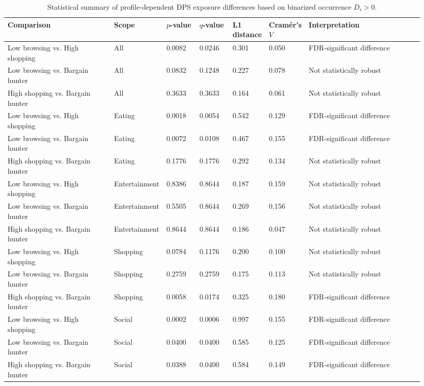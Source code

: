 \begin{table}[htbp]
    \centering
    \caption{Statistical summary of profile-dependent DPS exposure differences based on binarized occurrence \(D_i>0\).}
    \label{tab:statistical-summary}
    \footnotesize
    \setlength{\tabcolsep}{4pt}
    \renewcommand{\arraystretch}{1.08}
    \begin{tabular}{@{}p{0.26\linewidth}p{0.09\linewidth}p{0.08\linewidth}p{0.08\linewidth}p{0.08\linewidth}p{0.08\linewidth}p{0.28\linewidth}@{}}
        \toprule
        Comparison & Scope & $p$-value & $q$-value & L1 distance & Cramér's $V$ & Interpretation \\
        \midrule
        Low browsing vs. High shopping & All & 0.0082 & 0.0246 & 0.301 & 0.050 & FDR-significant difference \\
        Low browsing vs. Bargain hunter & All & 0.0832 & 0.1248 & 0.227 & 0.078 & Not statistically robust \\
        High shopping vs. Bargain hunter & All & 0.3633 & 0.3633 & 0.164 & 0.061 & Not statistically robust \\
        Low browsing vs. High shopping & Eating & 0.0018 & 0.0054 & 0.542 & 0.129 & FDR-significant difference \\
        Low browsing vs. Bargain hunter & Eating & 0.0072 & 0.0108 & 0.467 & 0.155 & FDR-significant difference \\
        High shopping vs. Bargain hunter & Eating & 0.1776 & 0.1776 & 0.292 & 0.134 & Not statistically robust \\
        Low browsing vs. High shopping & Entertainment & 0.8386 & 0.8644 & 0.187 & 0.159 & Not statistically robust \\
        Low browsing vs. Bargain hunter & Entertainment & 0.5505 & 0.8644 & 0.269 & 0.156 & Not statistically robust \\
        High shopping vs. Bargain hunter & Entertainment & 0.8644 & 0.8644 & 0.186 & 0.047 & Not statistically robust \\
        Low browsing vs. High shopping & Shopping & 0.0784 & 0.1176 & 0.200 & 0.100 & Not statistically robust \\
        Low browsing vs. Bargain hunter & Shopping & 0.2759 & 0.2759 & 0.175 & 0.113 & Not statistically robust \\
        High shopping vs. Bargain hunter & Shopping & 0.0058 & 0.0174 & 0.325 & 0.180 & FDR-significant difference \\
        Low browsing vs. High shopping & Social & 0.0002 & 0.0006 & 0.997 & 0.155 & FDR-significant difference \\
        Low browsing vs. Bargain hunter & Social & 0.0400 & 0.0400 & 0.585 & 0.125 & FDR-significant difference \\
        High shopping vs. Bargain hunter & Social & 0.0388 & 0.0400 & 0.584 & 0.149 & FDR-significant difference \\
        \bottomrule
    \end{tabular}
\end{table}


